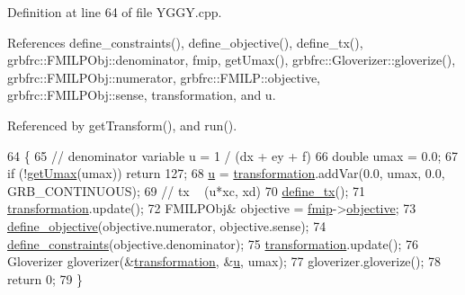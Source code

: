 Definition at line 64 of file Y\+G\+G\+Y.\+cpp.



References define\+\_\+constraints(), define\+\_\+objective(), define\+\_\+tx(), grbfrc\+::\+F\+M\+I\+L\+P\+Obj\+::denominator, fmip, get\+Umax(), grbfrc\+::\+Gloverizer\+::gloverize(), grbfrc\+::\+F\+M\+I\+L\+P\+Obj\+::numerator, grbfrc\+::\+F\+M\+I\+L\+P\+::objective, grbfrc\+::\+F\+M\+I\+L\+P\+Obj\+::sense, transformation, and u.



Referenced by get\+Transform(), and run().


\begin{DoxyCode}
64                     \{
65     \textcolor{comment}{// denominator variable u = 1 / (dx + ey + f)}
66     \textcolor{keywordtype}{double} umax = 0.0;
67     \textcolor{keywordflow}{if} (!\hyperlink{classgrbfrc_1_1YGGY_afe0f69f05c5d01ec48f510918eda7c94}{getUmax}(umax)) \textcolor{keywordflow}{return} 127;
68     \hyperlink{classgrbfrc_1_1YGGY_a1c24782afe02686a8eabc59b829cdec0}{u} = \hyperlink{classgrbfrc_1_1YGGY_a6f528d327b9dfbe474d357afe8a3d518}{transformation}.addVar(0.0, umax, 0.0, GRB\_CONTINUOUS);
69     \textcolor{comment}{// tx ~ (u*xc, xd)}
70     \hyperlink{classgrbfrc_1_1YGGY_a15b9f6f722a0b9cd36e540aca58ba483}{define\_tx}();
71     \hyperlink{classgrbfrc_1_1YGGY_a6f528d327b9dfbe474d357afe8a3d518}{transformation}.update();
72     FMILPObj& objective = \hyperlink{classgrbfrc_1_1YGGY_aa4f63c22c95cd48cd87756ebc5de53aa}{fmip}->\hyperlink{classgrbfrc_1_1FMILP_a8807cc16614684fd6053b44dcd65657c}{objective};
73     \hyperlink{classgrbfrc_1_1YGGY_a50330b6c73df5005ba5b303e7feb3917}{define\_objective}(objective.numerator, objective.sense);
74     \hyperlink{classgrbfrc_1_1YGGY_af6f49dee6ff5b2d40d1cd726065ba437}{define\_constraints}(objective.denominator);
75     \hyperlink{classgrbfrc_1_1YGGY_a6f528d327b9dfbe474d357afe8a3d518}{transformation}.update();
76     Gloverizer gloverizer(&\hyperlink{classgrbfrc_1_1YGGY_a6f528d327b9dfbe474d357afe8a3d518}{transformation}, &\hyperlink{classgrbfrc_1_1YGGY_a1c24782afe02686a8eabc59b829cdec0}{u}, umax);
77     gloverizer.gloverize();
78     \textcolor{keywordflow}{return} 0;
79 \}
\end{DoxyCode}



